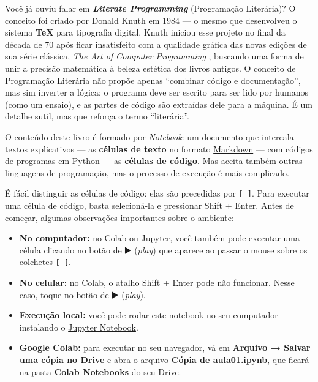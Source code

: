 \documentclass[
  portuguese,
  letterpaper,
  openany,
  oneside,
  12pt,
  a4paper]{book}
\providecommand{\tightlist}{%
  \setlength{\itemsep}{0pt}\setlength{\parskip}{0pt}}
\begin{document}

Você já ouviu falar em \textbf{\emph{Literate Programming}} (Programação
Literária)? O conceito foi criado por Donald Knuth em 1984
\autocite{knuth_literate_1984} --- o mesmo que desenvolveu o sistema
\textbf{TeX} para tipografia digital. Knuth iniciou esse projeto no
final da década de 70 após ficar insatisfeito com a qualidade gráfica
das novas edições de sua série clássica, \emph{The Art of Computer
Programming} \autocite{knuth_art_1997}, buscando uma forma de unir a
precisão matemática à beleza estética dos livros antigos. O conceito de
Programação Literária não propõe apenas ``combinar código e
documentação'', mas sim inverter a lógica: o programa deve ser escrito
para ser lido por humanos (como um ensaio), e as partes de código são
extraídas dele para a máquina. É um detalhe sutil, mas que reforça o
termo ``literária''.

O conteúdo deste livro é formado por \emph{Notebook}: um documento que
intercala textos explicativos --- as \textbf{células de texto} no
formato
\href{https://colab.research.google.com/notebooks/markdown_guide.ipynb}{Markdown}
--- com códigos de programas em \href{https://www.python.org/}{Python}
--- as \textbf{células de código}. Mas aceita também outras linguagens
de programação, mas o processo de execução é mais complicado.

É fácil distinguir as células de código: elas são precedidas por
\texttt{{[}\ {]}}. Para executar uma célula de código, basta
selecioná-la e pressionar Shift + Enter. Antes de começar, algumas
observações importantes sobre o ambiente:

\begin{itemize}
\tightlist
\item
  \textbf{No computador:} no Colab ou Jupyter, você também pode executar
  uma célula clicando no botão de ▶️ (\emph{play}) que aparece ao passar
  o mouse sobre os colchetes \texttt{{[}\ {]}}.
\item
  \textbf{No celular:} no Colab, o atalho Shift + Enter pode não
  funcionar. Nesse caso, toque no botão de ▶️ (\emph{play}).
\item
  \textbf{Execução local:} você pode rodar este notebook no seu
  computador instalando o \href{https://jupyter.org}{Jupyter Notebook}.
\item
  \textbf{Google Colab:} para executar no seu navegador, vá em
  \textbf{Arquivo → Salvar uma cópia no Drive} e abra o arquivo
  \textbf{Cópia de aula01.ipynb}, que ficará na pasta \textbf{Colab
  Notebooks} do seu Drive.
\end{itemize}
\end{document}
